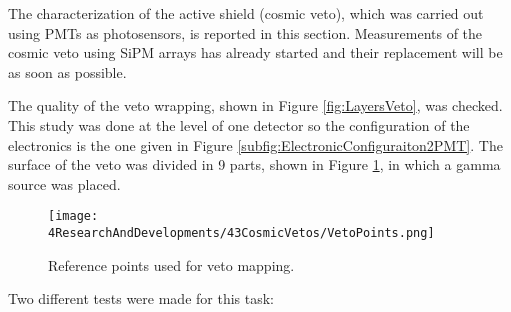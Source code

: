 The characterization of the active shield (cosmic veto), which was carried out using PMTs as photosensors, is reported in this section. Measurements of the cosmic veto using SiPM arrays has already started and their replacement will be as soon as possible. 

The quality of the veto wrapping, shown in Figure \ref{fig:LayersVeto}, was checked. This study was done at the level of one detector so the configuration of the electronics is the one given in Figure \ref{subfig:ElectronicConfiguraiton2PMT}. The surface of the veto was divided in 9 parts, shown in Figure \ref{fig:MappingPoints}, in which a gamma source was placed.

\begin{figure}[h]
\centering
\texttt{[image: 4ResearchAndDevelopments/43CosmicVetos/VetoPoints.png]}
\caption{Reference points used for veto mapping.\label{fig:MappingPoints}}
\end{figure}
Two different tests were made for this task:
